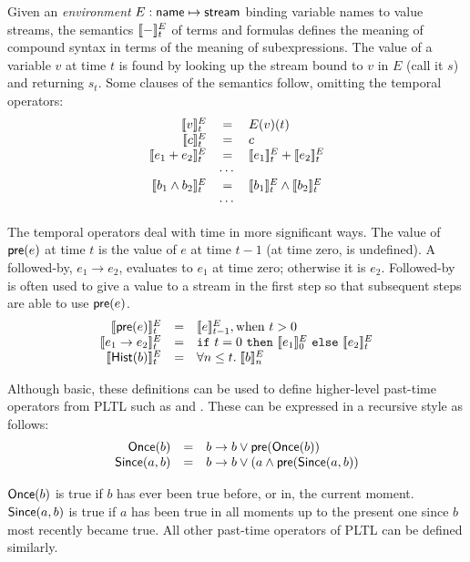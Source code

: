 Given an \emph{environment} $E : \mathsf{name} \mapsto \mathsf{stream}$
binding variable names to value streams, the semantics $[\![ - ]\!]^E_t$
of terms and formulas defines the meaning of compound syntax in terms
of the meaning of subexpressions. The value of a variable $v$ at time
$t$ is found by looking up the stream bound to $v$ in $E$ (call it
$s$) and returning $s_t$. Some clauses of the semantics follow,
omitting the temporal operators:
\[
\begin{array}{rcl}
\sem{v}^E_t & = & E(v)(t) \\
\sem{c}^E_t & = & c \\
\sem{e_1 + e_2}^E_t & = & \sem{e_1}^E_t + \sem{e_2}^E_t \\
   & \cdots & \\
\sem{b_1 \land b_2}^E_t & = & \sem{b_1}^E_t \land \sem{b_2}^E_t \\
   & \cdots & \\
\end{array}
\]

The temporal operators deal with time in more significant ways. The
value of $\mathsf{pre}(e)$ at time $t$ is the value of $e$ at time
$t-1$ (at time zero,  is undefined).
A followed-by, $e_1 \to e_2$, evaluates to $e_1$ at time zero; otherwise it is $e_2$.
Followed-by is often used to give a value to a stream in the first step so that subsequent steps are able to use $\mathsf{pre}(e)$.
\[
\begin{array}{rcl}
\sem{\konst{pre}(e)}^E_t & = & \sem{e}^E_{t-1}, \mathrm{when}\ t > 0 \\
\sem{e_1 \to e_2}^E_t & = & \itelse{t=0}{\sem{e_1}^E_0}{\sem{e_2}^E_t} \\
\sem{\konst{Hist}(b)}^E_t & = & \forall n \leq t.\; \sem{b}^E_n
\end{array}
\]

Although basic, these definitions can be used to define higher-level
past-time operators from PLTL such as  and .
These can be expressed in a recursive style as follows:
\[
\begin{array}{rcl}
\mathsf{Once}(b) & = & b \to b \vee \mathsf{pre}(\mathsf{Once}(b)) \\
\mathsf{Since}(a, b) & = & b \to b \lor (a \land \mathsf{pre}(\mathsf{Since}(a, b))
\end{array}
\]

$\mathsf{Once}(b)$ is true if $b$ has ever been true before, or in, the
current moment.  $\mathsf{Since}(a, b)$ is true if $a$ has been true in
all moments up to the present one since $b$ most recently became true.
All other past-time operators of PLTL can be defined similarly.
